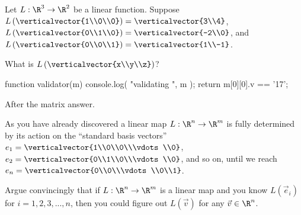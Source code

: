\documentclass{ximera}
\begin{document}
\begin{question}
  Let $L:\R^3 \to \R^2$ be a linear function.  Suppose $L\left(\verticalvector{1\\0\\0}\right) = \verticalvector{3\\4}$, 
  $L\left(\verticalvector{0\\1\\0}\right) = \verticalvector{-2\\0}$,  and  $L\left(\verticalvector{0\\0\\1}\right) = \verticalvector{1\\-1}$.
  
  \begin{solution}
    What is $L\left(\verticalvector{x\\y\\z}\right)$?

    \begin{matrix-answer}[name=M]
      function validator(m) {
        console.log( "validating ", m );
        return m[0][0].v == '17';
      }
    \end{matrix-answer}
    
  \end{solution}

  After the matrix answer.
\end{question}

As you have already discovered a linear map $L: \R^n \to \R^m$ is
fully determined by its action on the ``standard basis vectors'' $e_1 =
\verticalvector{1\\0\\0\\\vdots\\0}$, $e_2 = \verticalvector{0\\1\\0\\\vdots\\0}$, and so on, until we reach $e_n = \verticalvector{0\\0\\\vdots\\0\\1}$.

Argue convincingly that if $L:\R^n \to\R^m$ is a linear map and you know $L(\vec{e}_i)$ for $i=1,2,3,...,n$, then you could figure out $L(\vec{v})$ for
any $\vec{v} \in \R^n$.
\begin{free-response}
\end{free-response}
\end{document}
